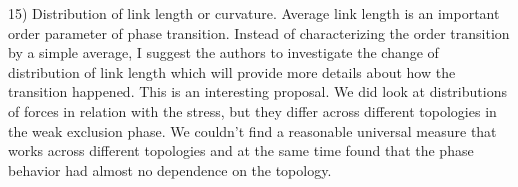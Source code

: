 \documentclass[11pt]{article}
\begin{document}
\begin{response}{
15) Distribution of link length or curvature. Average link length is an important order parameter of phase transition. Instead of characterizing the order transition by a simple average, I suggest the authors to investigate the change of distribution of link length which will provide more details about how the transition happened.
}
This is an interesting proposal. 
We did look at distributions of forces in relation with the stress, but they differ across different topologies in the weak exclusion phase.
We couldn't find a reasonable universal measure that works across different topologies and at the same time found that the phase behavior had almost no dependence on the topology. 

\end{response}





\end{document}
